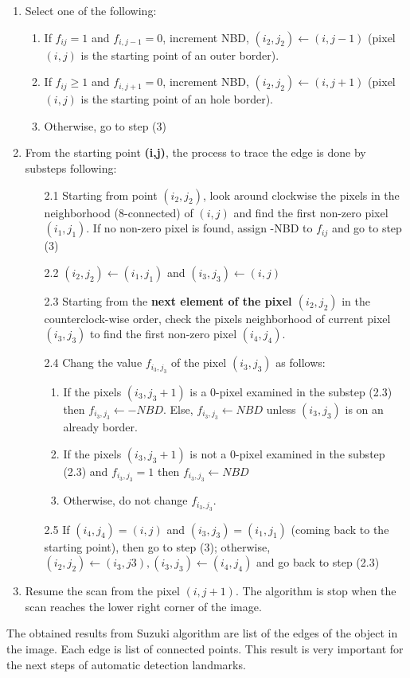 \begin{enumerate}
	\item Select one of the following:
		\begin{enumerate}
			\item If \textbf{$f_{ij} = 1$} and \textbf{$f_{i,j-1} = 0$}, increment NBD, $(i_2,j_2) \gets (i,j-1)$ (pixel $(i,j)$ is the starting point of an outer border).
			\item If \textbf{$f_{ij} \geq 1$} and \textbf{$f_{i,j+1} = 0$}, increment NBD, $(i_2,j_2) \gets (i,j+1)$ (pixel $(i,j)$ is the starting point of an hole border).
			\item Otherwise, go to step (3)
		\end{enumerate}
	\item From the starting point \textbf{(i,j)}, the process to trace the edge is done by substeps following:
		\begin{itemize}
			\item[2.1] Starting from point $(i_2,j_2)$, look around clockwise the pixels in the neighborhood (8-connected) of $(i,j)$ and find the first non-zero pixel $(i_1,j_1)$. If no non-zero pixel is found, assign -NBD to $f_{ij}$ and go to step (3)
			\item[2.2] $(i_2,j_2) \gets (i_1,j_1)$ and $(i_3,j_3) \gets (i,j)$
			\item[2.3] Starting from the \textbf{next element of the pixel $(i_2,j_2)$} in the counterclock-wise order, check the pixels neighborhood of current pixel $(i_3,j_3)$ to find the first non-zero pixel $(i_4,j_4)$.
			\item[2.4] Chang the value $f_{i_3,j_3}$ of the pixel $(i_3,j_3)$ as follows:
				\begin{enumerate}
					\item If the pixels $(i_3,j_3+1)$ is a 0-pixel examined in the substep (2.3) then $f_{i_3,j_3} \gets -NBD$. Else, $f_{i_3,j_3} \gets NBD$ unless $(i_3,j_3)$ is on an already border.
					\item If the pixels $(i_3,j_3+1)$ is not a 0-pixel examined in the substep (2.3) and $f_{i_3,j_3} = 1$ then $f_{i_3,j_3} \gets NBD$
					\item Otherwise, do not change $f_{i_3,j_3}$.
				\end{enumerate}
			\item[2.5] If $(i_4,j_4) = (i,j)$ and $(i_3,j_3) = (i_1,j_1)$ (coming back to the starting point), then go to step (3); otherwise, $(i_2,j_2) \gets (i_3,j3), (i_3,j_3) \gets (i_4,j_4)$ and go back to step (2.3)
		\end{itemize}
	\item Resume the scan from the pixel $(i,j+1)$. The algorithm is stop when the scan reaches the lower right corner of the image.
\end{enumerate}
The obtained results from Suzuki algorithm are list of the edges of the object in the image. Each edge is list of connected points. This result is very important for the next steps of automatic detection landmarks.
